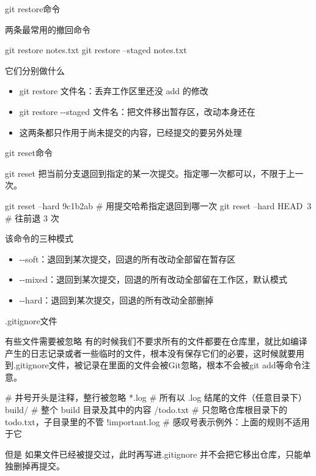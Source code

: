 \documentclass[aspectratio=169]{beamer}
\begin{document}
\begin{frame}[fragile]{git restore命令}
\begin{block}{两条最常用的撤回命令}
{
\begin{semiverbatim}
git restore notes.txt
git restore --staged notes.txt
\end{semiverbatim}
}
\end{block}
	\begin{block}{它们分别做什么}
		\begin{itemize}
			\item git restore 文件名：丢弃工作区里还没 add 的修改
			\item git restore -{}-staged 文件名：把文件移出暂存区，改动本身还在
			\item 这两条都只作用于尚未提交的内容，已经提交的要另外处理
		\end{itemize}
	\end{block}
	
\end{frame}

\begin{frame}[fragile]{git reset命令}
\begin{block}{git reset}
把当前分支退回到指定的某一次提交。指定哪一次都可以，不限于上一次。
{
\begin{semiverbatim}
git reset --hard 9c1b2ab    # 用提交哈希指定退回到哪一次
git reset --hard HEAD~3     # 往前退 3 次
\end{semiverbatim}
}
\end{block}
	\begin{block}{该命令的三种模式}
		\begin{itemize}
			\item -{}-soft：退回到某次提交，回退的所有改动全部留在暂存区
			\item -{}-mixed：退回到某次提交，回退的所有改动全部留在工作区，默认模式
			\item -{}-hard：退回到某次提交，回退的所有改动全部删掉
		\end{itemize}
	\end{block}
\end{frame}

\begin{frame}[fragile]{.gitignore文件}
\begin{block}{有些文件需要被忽略}
\hspace*{2em}有的时候我们不要求所有的文件都要在仓库里，就比如编译产生的日志记录或者一些临时的文件，根本没有保存它们的必要，这时候就要用到.gitignore文件，被记录在里面的文件会被Git忽略，根本不会被git add等命令注意。
{
\begin{semiverbatim}
# 井号开头是注释，整行被忽略
*.log            # 所有以 .log 结尾的文件（任意目录下）
build/           # 整个 build 目录及其中的内容
/todo.txt        # 只忽略仓库根目录下的 todo.txt，子目录里的不管
!important.log   # 感叹号表示例外：上面的规则不适用于它
\end{semiverbatim}
}
\end{block}

	\begin{block}{但是}
	如果文件已经被提交过，此时再写进.gitignore 并不会把它移出仓库，只能单独删掉再提交。
	\end{block}
\end{frame}
\end{document}

